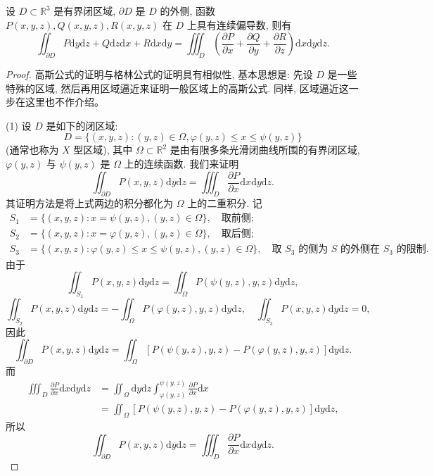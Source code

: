 \documentclass[UTF8,12pt,a4paper,fontset=fandol]{ctexart}
\begin{document}
\begin{theorem}[高斯公式]\label{course-theorem-16-5-2}\quad 设 $D\subset\mathbb R^3$ 是有界闭区域, $\partial D$ 是 $D$ 的外侧, 函数\allowbreak $P(x,y,z),Q(x,y,z),R(x,y,z)$ 在 $D$ 上具有连续偏导数, 则有
\[
  \iint_{\partial D}P\mathrm dy\mathrm dz+Q\mathrm dz\mathrm dx+R\mathrm dx\mathrm dy
  =\iiint_D\left(\frac{\partial P}{\partial x}+\frac{\partial Q}{\partial y}
  +\frac{\partial R}{\partial z}\right)\mathrm dx\mathrm dy\mathrm dz.
\]

\end{theorem}
\begin{proof}\quad 高斯公式的证明与格林公式的证明具有相似性, 基本思想是: 先设 $D$ 是一些特殊的区域, 然后再用区域逼近来证明一般区域上的高斯公式. 同样, 区域逼近这一步在这里也不作介绍。

(1) 设 $D$ 是如下的闭区域:
\[
  D=\{(x,y,z):(y,z)\in\Omega,\varphi(y,z)\leqslant x\leqslant\psi(y,z)\}
\]
(通常也称为 $X$ 型区域), 其中 $\Omega\subset\mathbb R^2$ 是由有限多条光滑闭曲线所围的有界闭区域, $\varphi(y,z)$ 与 $\psi(y,z)$ 是 $\Omega$ 上的连续函数. 我们来证明
\[
  \iint_{\partial D}P(x,y,z)\mathrm dy\mathrm dz
  =\iiint_D\frac{\partial P}{\partial x}\mathrm dx\mathrm dy\mathrm dz.
\]
其证明方法是将上式两边的积分都化为 $\Omega$ 上的二重积分. 记
\[
\begin{aligned}
  S_1&=\{(x,y,z):x=\psi(y,z),(y,z)\in\Omega\},\quad \text{取前侧};\\
  S_2&=\{(x,y,z):x=\varphi(y,z),(y,z)\in\Omega\},\quad \text{取后侧};\\
  S_3&=\{(x,y,z):\varphi(y,z)\leqslant x\leqslant\psi(y,z),(y,z)\in\Omega\},
    \quad \text{取 $S_3$ 的侧为 $S$ 的外侧在 $S_3$ 的限制}.
\end{aligned}
\]
由于
\[
  \iint_{S_1}P(x,y,z)\mathrm dy\mathrm dz
  =\iint_\Omega P(\psi(y,z),y,z)\mathrm dy\mathrm dz,
\]
\[
  \iint_{S_2}P(x,y,z)\mathrm dy\mathrm dz
  =-\iint_\Omega P(\varphi(y,z),y,z)\mathrm dy\mathrm dz,\quad
  \iint_{S_3}P(x,y,z)\mathrm dy\mathrm dz=0,
\]
因此
\[
  \iint_{\partial D}P(x,y,z)\mathrm dy\mathrm dz
  =\iint_\Omega[P(\psi(y,z),y,z)-P(\varphi(y,z),y,z)]\mathrm dy\mathrm dz.
\]
而
\[
\begin{aligned}
  \iiint_D\frac{\partial P}{\partial x}\mathrm dx\mathrm dy\mathrm dz
  &=\iint_\Omega\mathrm dy\mathrm dz
    \int_{\varphi(y,z)}^{\psi(y,z)}\frac{\partial P}{\partial x}\mathrm dx\\
  &=\iint_\Omega[P(\psi(y,z),y,z)-P(\varphi(y,z),y,z)]\mathrm dy\mathrm dz,
\end{aligned}
\]
所以
\[
  \iint_{\partial D}P(x,y,z)\mathrm dy\mathrm dz
  =\iiint_D\frac{\partial P}{\partial x}\mathrm dx\mathrm dy\mathrm dz.
\]


\end{proof}
\end{document}
